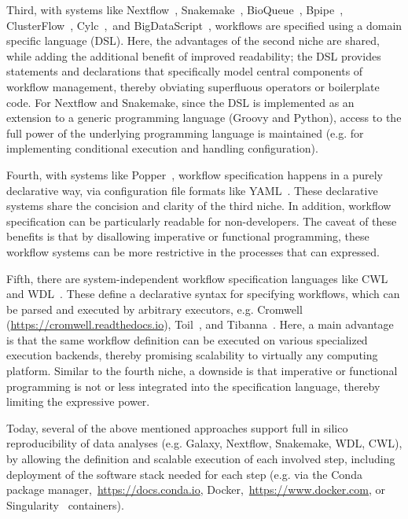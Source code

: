 \documentclass[parskip=half, DIV=18]{scrartcl}
\let\plainurl\url
\renewcommand{\url}[1]{\protect\plainurl{#1}}
\begin{document}
Third, with systems like Nextflow~\parencite{Di_Tommaso_2017}, Snakemake~\parencite{Koester2012}, BioQueue~\parencite{Yao2017}, Bpipe~\parencite{Sadedin2012}, ClusterFlow~\parencite{Ewels2016}, Cylc~\parencite{J_Oliver_2018},~and BigDataScript~\parencite{Cingolani_2014}, workflows are specified using a domain specific language (DSL).
Here, the advantages of the second niche are shared, while adding the additional benefit of improved readability; the DSL provides statements and declarations that specifically model central components of workflow management, thereby obviating superfluous operators or boilerplate code.
For Nextflow and Snakemake, since the DSL is implemented as an extension to a generic programming language (Groovy and Python), access to the full power of the underlying programming language is maintained (e.g. for implementing conditional execution and handling configuration).

Fourth, with systems like Popper~\parencite{Jimenez_2017}, workflow specification happens in a purely declarative way, via configuration file formats like YAML~\parencite{Evans2009-vp}.
These declarative systems share the concision and clarity of the third niche.
In addition, workflow specification can be particularly readable for non-developers.
The caveat of these benefits is that by disallowing imperative or functional programming, these workflow systems can be more restrictive in the processes that can expressed.

Fifth, there are system-independent workflow specification languages like CWL~\parencite{cwl} and WDL~\parencite{voss_full-stack_2017}.
These define a declarative syntax for specifying workflows, which can be parsed and executed by arbitrary executors, e.g. Cromwell (\url{https://cromwell.readthedocs.io}), Toil~\parencite{Vivian_2017}, and Tibanna~\parencite{Lee_2019}.
Here, a main advantage is that the same workflow definition can be executed on various specialized execution backends, thereby promising scalability to virtually any computing platform.
Similar to the fourth niche, a downside is that imperative or functional programming is not or less integrated into the specification language, thereby limiting the expressive power.

Today, several of the above mentioned approaches support full in silico reproducibility of data analyses (e.g. Galaxy, Nextflow, Snakemake, WDL, CWL), by allowing the definition and scalable execution of each involved step, including deployment of the software stack needed for each step (e.g. via the Conda package manager,~\url{https://docs.conda.io}, Docker,~\url{https://www.docker.com}, or Singularity~\parencite{kurtzer_singularity_2017} containers).
\end{document}

